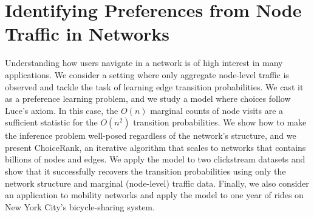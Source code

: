 \chapter{Identifying Preferences from Node Traffic in Networks}
\label{ch:choicerank}

Understanding how users navigate in a network is of high interest in many applications.
We consider a setting where only aggregate node-level traffic is observed and tackle the task of learning edge transition probabilities.
We cast it as a preference learning problem, and we study a model where choices follow Luce's axiom.
In this case, the $O(n)$ marginal counts of node visits are a sufficient statistic for the $O(n^2)$ transition probabilities.
We show how to make the inference problem well-posed regardless of the network's structure, and we present ChoiceRank, an iterative algorithm that scales to networks that contains billions of nodes and edges.
We apply the model to two clickstream datasets and show that it successfully recovers the transition probabilities using only the network structure and marginal (node-level) traffic data.
Finally, we also consider an application to mobility networks and apply the model to one year of rides on New York City's bicycle-sharing system.













